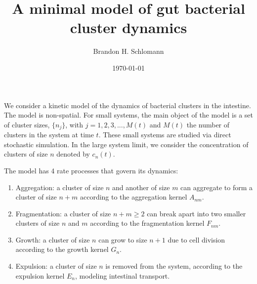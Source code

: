 \documentclass[12pt]{article}
\begin{document}
\title{A minimal model of gut bacterial cluster dynamics}
\author{Brandon H. Schlomann}
\date{\today}




\maketitle
\setlength\parskip{12pt}
\setlength\parindent{0pt}

We consider a kinetic model of the dynamics of bacterial clusters in the intestine.  The model is non-spatial. For small systems, the main object of the model is a set of cluster sizes, $\{n_j\}$, with $j = 1,2,3,...,M(t)$ and $M(t)$ the number of clusters in the system at time $t$. These small systems are studied via direct stochastic simulation.  In the large system limit, we consider the concentration of clusters of size $n$ denoted by $c_n(t)$.  

The model has 4 rate processes that govern its dynamics:

\begin{enumerate}

\item
Aggregation: a cluster of size $n$ and another of size $m$ can aggregate to form a cluster of size $n+m$ according to the aggregation kernel $A_{nm}$.

\item
Fragmentation: a cluster of size $n+m\ge 2$ can break apart into two smaller clusters of size $n$ and $m$ according to the fragmentation kernel $F_{nm}$.

\item
Growth: a cluster of size $n$ can grow to size $n+1$ due to cell division according to the growth kernel $G_n$. 

\item
Expulsion: a cluster of size $n$ is removed from the system, according to the expulsion kernel $E_n$, modeling intestinal transport. 
\end{enumerate}


\end{document}
